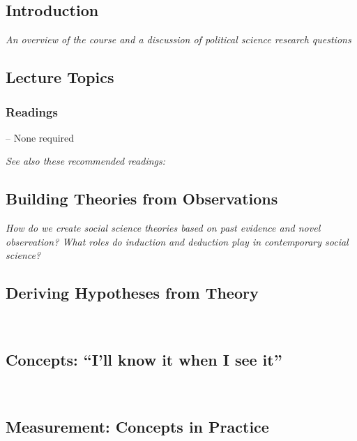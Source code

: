 \documentclass[12pt,a4paper]{article}
\newcommand{\lecture}[3][\DefaultOpt]{%
  \def\DefaultOpt{#2}%
  \clearpage\subsection[#1]{#2}\emph{#3}\vspace{.25em}\\
}
\newcommand{\thomas}{\vspace{1em}\noindent Instructor: Thomas\\}
\newcommand{\seealso}{\noindent \emph{See also these recommended readings:}}
\begin{document}
\secttoc

\clearpage


\lecture{Introduction}{An overview of the course and a discussion of political science research questions}


\subsection*{Lecture Topics}

\begin{itemize*}
\item 
\end{itemize*}

\subsubsection*{Readings}

-- None required

\seealso



\lecture{Building Theories from Observations}{How do we create social science theories based on past evidence and novel observation? What roles do induction and deduction play in contemporary social science?}

\lecture{Deriving Hypotheses from Theory}{} %

\lecture{Concepts: ``I'll know it when I see it''}{}


\lecture{Measurement: Concepts in Practice}{}
\end{document}
